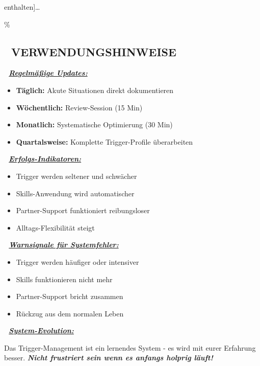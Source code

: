 enthalten{]}\ldots{}

\hypertarget{verwendungshinweise}{\%
\subsection{\texorpdfstring{📝 \textbf{VERWENDUNGSHINWEISE}}{📝 VERWENDUNGSHINWEISE}}\label{verwendungshinweise}}

\textbf{📅 \emph{\ul{Regelmäßige Updates:}}}

\begin{itemize}
\tightlist
\item
  \textbf{Täglich:} Akute Situationen direkt dokumentieren
\item
  \textbf{Wöchentlich:} Review-Session (15 Min)
\item
  \textbf{Monatlich:} Systematische Optimierung (30 Min)
\item
  \textbf{Quartalsweise:} Komplette Trigger-Profile überarbeiten
\end{itemize}

\textbf{🎯 \emph{\ul{Erfolgs-Indikatoren:}}}

\begin{itemize}
\tightlist
\item
  Trigger werden seltener und schwächer
\item
  Skills-Anwendung wird automatischer
\item
  Partner-Support funktioniert reibungsloser
\item
  Alltags-Flexibilität steigt
\end{itemize}

\textbf{🚨 \emph{\ul{Warnsignale für Systemfehler:}}}

\begin{itemize}
\tightlist
\item
  Trigger werden häufiger oder intensiver
\item
  Skills funktionieren nicht mehr
\item
  Partner-Support bricht zusammen
\item
  Rückzug aus dem normalen Leben
\end{itemize}

\textbf{🔄 \emph{\ul{System-Evolution:}}}

Das Trigger-Management ist ein lernendes System - es wird mit eurer Erfahrung besser. \emph{\textbf{Nicht frustriert sein wenn es anfangs holprig läuft!}}
